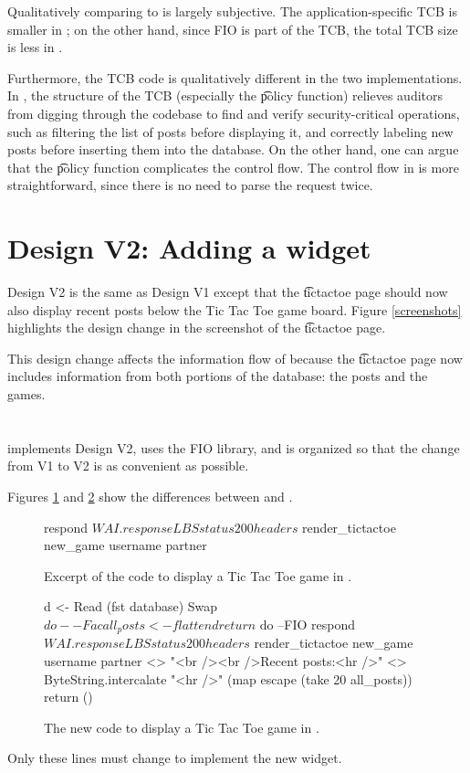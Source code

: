 \begin{refsection}
Qualitatively comparing \viF{} to \viN{} is largely subjective.
%
The application-specific TCB is smaller in \viF{};
on the other hand,
since FIO is part of the TCB,
the total TCB size is less in \viN{}.

Furthermore, the TCB code is qualitatively different in the two implementations.
%
In \viF, the structure of the TCB (especially the \t{policy} function)
relieves auditors from digging through the codebase to find and verify security-critical operations,
such as filtering the list of posts before displaying it,
and correctly labeling new posts before inserting them into the database.
%
On the other hand,
one can argue that the \t{policy} function complicates the control flow.
The control flow in \viN{} is more straightforward,
since there is no need to parse the request twice.

\section{Design V2: Adding a widget}

Design V2 is the same as Design V1 except that the \t{tictactoe} page should now also display recent posts below the Tic Tac Toe game board.
%
Figure \ref{screenshots} highlights the design change in the screenshot of the \t{tictactoe} page.

This design change affects the information flow of \myapp{} because the \t{tictactoe} page now includes information from both portions of the database:
the posts and the games.

\section{\viiF}

\myapp{} \viiF{} implements Design V2,
uses the FIO library,
and is organized so that the change from V1 to V2 is as convenient as possible.

Figures \ref{code_tictactoe_viF} and \ref{code_tictactoe_viiF} show the differences between \viF{} and \viiF{}.
\begin{figure}
\begin{fb}
respond $ WAI.responseLBS status200 headers $
    render_tictactoe new_game username partner
\end{fb}
\caption{Excerpt of the code to display a Tic Tac Toe game in \viF{}.}
\label{code_tictactoe_viF}
\end{figure}
\begin{figure}
\begin{fb}
d <- Read (fst database)
Swap $ do  --Fac
  all_posts <- flatten d
  return $ do  --FIO
    respond $ WAI.responseLBS status200 headers $
        render_tictactoe new_game username partner <>
        "<br /><br />Recent posts:<hr />" <>
        ByteString.intercalate "<hr />" (map escape (take 20 all_posts))
return ()
\end{fb}
\caption{The new code to display a Tic Tac Toe game in \viiF{}.}
\label{code_tictactoe_viiF}
\end{figure}
Only these lines must change to implement the new widget.


\end{refsection}
